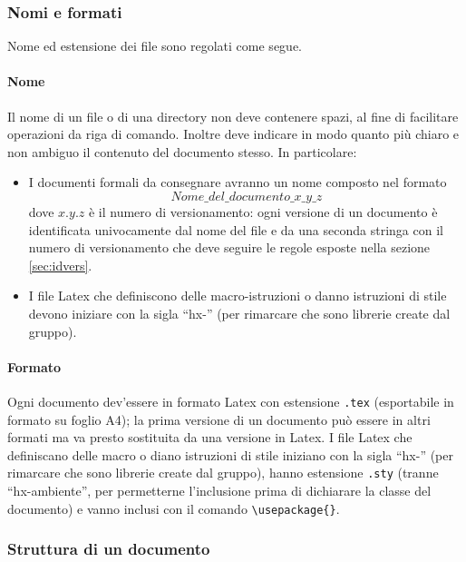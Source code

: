 \subsubsection{Nomi e formati} Nome ed estensione dei file sono regolati come segue.
\paragraph{Nome} Il nome di un file o di una directory non deve contenere spazi, al fine di facilitare operazioni da riga di comando. Inoltre deve indicare in modo quanto più chiaro e non ambiguo il contenuto del documento stesso. In particolare:
\begin{itemize}
	\item I documenti formali da consegnare avranno un nome composto nel formato
		\[Nome\_del\_documento\_x\_y\_z\]
	dove $x.y.z$ è il numero di versionamento: ogni versione di un documento è identificata univocamente dal nome del file e da una seconda stringa con il numero di versionamento che deve seguire le regole esposte nella sezione \ref{sec:idvers}.
	\item I file Latex che definiscono delle macro-istruzioni o danno istruzioni di stile devono iniziare con la sigla “hx-” (per rimarcare che sono librerie create dal gruppo).
\end{itemize}
\paragraph{Formato} Ogni documento dev'essere in formato Latex con estensione \texttt{.tex} (esportabile in formato  su foglio A4); la prima versione di un documento può essere in altri formati ma va presto sostituita da una versione in Latex. I file Latex che definiscano delle macro o diano istruzioni di stile iniziano con la sigla “hx-” (per rimarcare che sono librerie create dal gruppo), hanno estensione \texttt{.sty} (tranne “hx-ambiente”, per permetterne l'inclusione prima di dichiarare la classe del documento) e vanno inclusi con il comando \texttt{\textbackslash usepackage\{\}}.

\subsubsection{Struttura di un documento}

